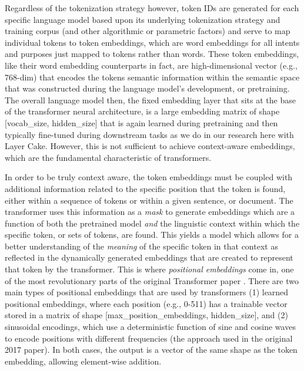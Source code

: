 \documentclass[final]{clv2025-revised}
\begin{document}
Regardless of the tokenization strategy however, token IDs are generated for each specific language model based upon its underlying tokenization strategy and training corpus (and other algorithmic or parametric factors) and serve to map individual tokens to token embeddings, which are word embeddings for all intents and purposes just mapped to tokens rather than words. These token embeddings, like their word embedding counterparts in fact, are high-dimensional vector (e.g., 768-dim) that encodes the tokens semantic information within the semantic space that was constructed during the language model's development, or pretraining. The overall language model then, the fixed embedding layer that sits at the base of the transformer neural architecture, is a large embedding matrix of shape [vocab\_size, hidden\_size] that is again learned during pretraining and then typically fine-tuned during downstream tasks as we do in our research here with Layer Cake. However, this is not sufficient to achieve context-aware embeddings, which are the fundamental characteristic of transformers. 

In order to be truly context aware, the token embeddings must be coupled with additional information related to the specific position that the token is found, either within a sequence of tokens or within a given sentence, or document. The transformer uses this information as a \textit{mask} to generate embeddings which are a function of both the pretrained model \textit{and} the linguistic context within which the specific token, or sets of tokens, are found. This yields a model which allows for a better understanding of the \textit{meaning} of the specific token in that context as reflected in the dynamically generated embeddings that are created to represent that token by the transformer. This is where \textit{positional embeddings} come in, one of the most revolutionary parts of the original Transformer paper \cite{vaswani}. There are two main types of positional embeddings that are used by transformers (1) learned positional embeddings, where each position (e.g., 0-511) has a trainable vector stored in a matrix of shape [max\_position\_embeddings, hidden\_size], and (2) sinusoidal encodings, which use a deterministic function of sine and cosine waves to encode positions with different frequencies (the approach used in the original 2017 paper). In both cases, the output is a vector of the same shape as the token embedding, allowing element-wise addition.
\end{document}
